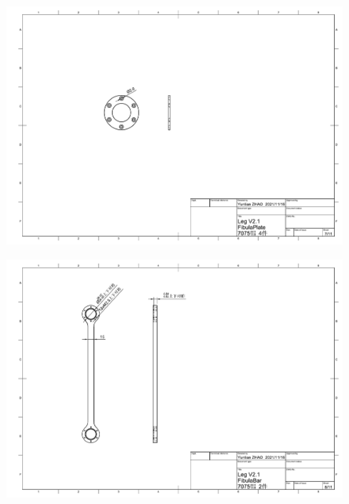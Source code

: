 \begin{figure}
  \centering
  \includegraphics[width=1.4\linewidth, angle=90]{figures/appendix/dwg7.pdf}
   \vspace{6pt}
\end{figure}

\begin{figure}
  \centering
  \includegraphics[width=1.4\linewidth, angle=90]{figures/appendix/dwg8.pdf}
   \vspace{6pt}
\end{figure}

